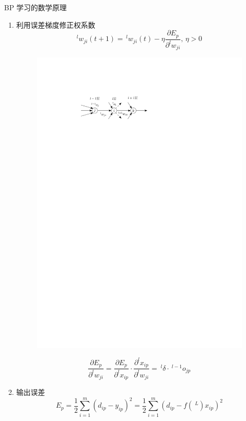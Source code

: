 \begin{note}
    BP 学习的数学原理
    \begin{enumerate}
        \item 利用误差梯度修正权系数
        \[
            ^{l}w_{ji}(t+1) =\, ^{l}w_{ji}(t)-\eta\dfrac{\partial E_p}{\partial ^{l}w_{ji}},\,\eta>0
        \]
        \begin{figure}[htbp]
            \centering
            \includegraphics{image/BP网络相关记号.pdf}
        \end{figure}
        \[
            \dfrac{\partial E_p}{\partial ^{l}w_{ji}} = \dfrac{\partial E_p}{\partial ^{l}x_{ip}}\cdot \dfrac{\partial ^{l}x_{ip}}{\partial ^{l}w_{ji}} =\ ^{l}\delta\cdot\ ^{l-1}o_{jp}
        \]
        \item 输出误差
        \[
            E_{p} = \dfrac{1}{2}\sum\limits_{i = 1}^{m}\left( d_{ip}-y_{ip} \right)^2 =   \dfrac{1}{2}\sum\limits_{i = 1}^{m}\left( d_{ip}-f(\ ^{L})x_{ip} \right)^2  
\]
\end{enumerate}
\end{note}
